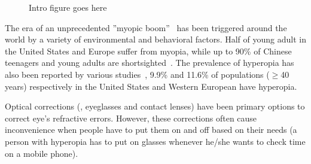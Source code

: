 \begin{figure*}
    \begin{center}
    \fbox{\rule{0pt}{2in} \rule{.9\linewidth}{0pt}}
    \end{center}
    \caption{Intro figure goes here}
    \label{fig:intro}
\end{figure*}

The era of an unprecedented ''myopic boom''~\cite{dolgin2015myopia} has been triggered around the world by a variety of environmental and behavioral factors. Half of young adult in the United States and Europe suffer from myopia, while up to 90\% of Chinese teenagers and young adults are shortsighted~\cite{dolgin2015myopia}. The prevalence of hyperopia has also been reported by various studies~\cite{yoo2013refractive, visionstudy}, 9.9\% and 11.6\% of populations ($\geq$40 years) respectively in the United States and Western European have hyperopia. 

Optical corrections (\ie, eyeglasses and contact lenses) have been primary options to correct eye's refractive errors. However, these corrections often cause inconvenience when people have to put them on and off based on their needs (\ie a person with hyperopia has to put on glasses whenever he/she wants to check time on a mobile phone). 


